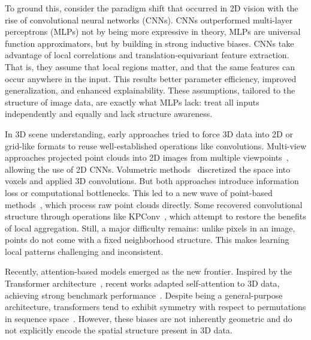 To ground this, consider the paradigm shift that occurred in 2D vision with the
rise of convolutional neural networks (CNNs). CNNs outperformed multi-layer
perceptrons (MLPs) not by being more expressive in theory, MLPs are universal
function approximators, but by building in strong inductive biases.
%
CNNs take advantage of local correlations and translation-equivariant feature
extraction. That is, they assume that local regions matter, and that the same
features can occur anywhere in the input. This results better parameter
efficiency, improved generalization, and enhanced explainability.
%
These assumptions, tailored to the structure of image data, are exactly what
MLPs lack: treat all inputs independently and equally and lack structure
awareness.
%

In 3D scene understanding, early approaches tried to force 3D data into 2D or
grid-like formats to reuse well-established operations like convolutions.
%
Multi-view approaches projected point clouds into 2D images from multiple
viewpoints~\cite{su2015multi,lawin2017deep,feng2018gvcnn}, allowing the use of
2D CNNs.
%
Volumetric
methods~\cite{maturana2015voxnet,zhang2020polarnet,chen2023voxelnext}
discretized the space into voxels and applied 3D convolutions. But both
approaches introduce information loss or computational bottlenecks.
%
This led to a new wave of point-based
methods~\cite{qi2017pointnet,qi2017pointnet++,li2018pointcnn,thomas2019kpconv,hu2020randla,kong2023rethinking,qian2022pointnext},
which process raw point clouds directly. Some recovered convolutional structure
through operations like KPConv~\cite{thomas2019kpconv}, which attempt to
restore the benefits of local aggregation.
%
Still, a major difficulty remains: unlike pixels in an image, points do not
come with a fixed neighborhood structure. This makes learning local patterns
challenging and inconsistent.

Recently, attention-based models emerged as the new frontier. Inspired by the
Transformer architecture~\cite{vaswani2017attention}, recent works adapted
self-attention to 3D data, achieving strong benchmark
performance~\cite{zhao2021point,wu2022point,lai2022stratified,park2022fast,wang2023octformer,lai2023spherical,wu2023ptv3}.
Despite being a general-purpose architecture, transformers tend to exhibit
symmetry with respect to permutations in sequence
space~\cite{lavie2024towards}.
%
However, these biases are not inherently geometric and do not explicitly encode
the spatial structure present in 3D data.
%

